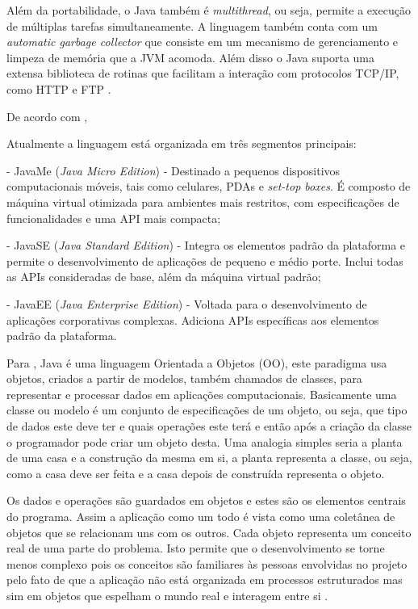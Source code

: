 \par Além da portabilidade, o Java também é \textit{multithread}, ou seja,
permite a execução de múltiplas tarefas simultaneamente. A linguagem também
conta com um \textit{automatic garbage collector} que consiste em um mecanismo
de gerenciamento e limpeza de memória que a JVM acomoda. Além disso o Java
suporta uma extensa biblioteca de rotinas que facilitam a interação com protocolos 
TCP/IP, como HTTP e FTP \cite{livro_java_complete_references}.

\par De acordo com , 

\begin{citacao} Atualmente a linguagem está organizada em três segmentos
principais:


	- JavaMe (\textit{Java Micro Edition}) - Destinado a pequenos dispositivos
	computacionais móveis, tais como celulares, PDAs e \textit{set-top boxes}. É
	composto de máquina virtual otimizada para ambientes mais restritos, com
	especificações de funcionalidades e uma API mais compacta;
	  
	- JavaSE (\textit{Java Standard Edition}) - Integra os elementos padrão
	da plataforma e permite o desenvolvimento de aplicações de pequeno e médio porte. Inclui todas as APIs consideradas de base,
além da máquina virtual padrão;

	- JavaEE (\textit{Java Enterprise Edition}) - Voltada para o desenvolvimento
	de aplicações corporativas complexas. Adiciona APIs específicas aos elementos
	padrão da plataforma.
	

\end{citacao}


\par Para , Java é
uma linguagem Orientada a Objetos (OO), este paradigma usa objetos, criados a
partir de modelos, também chamados de classes, para representar e processar
dados em aplicações computacionais. Basicamente uma classe ou modelo é um
conjunto de especificações de um objeto, ou seja, que tipo de dados este deve
ter e quais operações este terá e então após a criação da classe o programador
pode criar um objeto desta. Uma analogia simples seria a planta de uma casa e a
construção da mesma em si, a planta representa a classe, ou seja, como a casa deve ser feita e a casa depois de construída representa o objeto.

\par Os dados e operações são guardados em objetos e estes são os elementos
centrais do programa. Assim a aplicação como um todo é vista como uma coletânea
de objetos que se relacionam uns com os outros. Cada objeto representa um conceito real de uma parte do problema. 
Isto permite que o desenvolvimento se torne menos complexo pois os conceitos são familiares
às pessoas envolvidas no projeto pelo fato de que a aplicação não está
organizada em processos estruturados mas sim em objetos que espelham o mundo real e interagem entre si  \cite{teste_doutorado_manzoni}.

